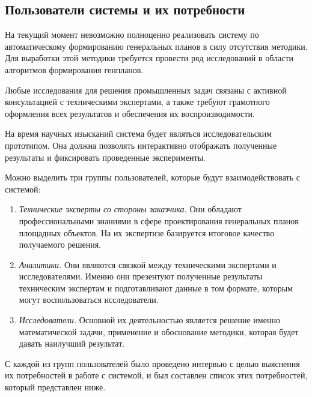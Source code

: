 \subsection{\large{Пользователи системы и их потребности}}

На текущий момент невозможно полноценно реализовать систему по автоматическому
формированию генеральных планов в силу отсутствия методики.
Для выработки этой методики требуется провести ряд исследований в области
алгоритмов формирования генпланов.

Любые исследования для решения промышленных задач связаны с активной консультацией
с техническими экспертами,
а также требуют грамотного оформления всех результатов и обеспечения их воспроизводимости.

На время научных изысканий система будет являться исследовательским прототипом.
Она должна позволять интерактивно отображать полученные результаты и фиксировать проведенные эксперименты.

Можно выделить три группы пользователей, которые будут взаимодействовать с системой:
\begin{enumerate}
    \item {
        \textit{Технические эксперты со стороны заказчика.} Они обладают профессиональными знаниями в сфере
        проектирования генеральных планов площадных объектов. На их экспертизе базируется итоговое
        качество получаемого решения.
    }
    \item{
        \textit{Аналитики.} Они являются связкой между техническими экспертами и исследователями.
        Именно они презентуют полученные результаты техническим экспертам и подготавливают данные в том формате,
        которым могут воспользоваться исследователи.
    }
    \item{
        \textit{Исследователи.} Основной их деятельностью является решение именно математической задачи,
        применение и обоснование методики, которая будет давать наилучший результат.
    }
\end{enumerate}

С каждой из групп пользователей было проведено интервью с целью выяснения их потребностей в работе с системой,
и был составлен список этих потребностей, который представлен ниже.

